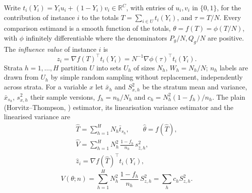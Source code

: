 Write $t_i(Y_i)=Y_iu_i+(1-Y_i)v_i\in\mathbb{R}^C$, with entries of $u_i,v_i$ in $\{0,1\}$, for the contribution of instance $i$
to the totals $T=\sum_{i\in U}t_i(Y_i)$, and $\tau=T/N$. Every comparison estimand is a smooth function of the totals,
$\theta=f(T)=\phi(T/N)$, with $\phi$ infinitely differentiable where the denominators $P_g/N,Q_g/N$ are positive. The
\emph{influence value} of instance $i$ is
\begin{equation}\label{eq:influence}
z_i=\nabla f(T)^{\top}t_i(Y_i)=N^{-1}\nabla\phi(\tau)^{\top}t_i(Y_i).
\end{equation}
Strata $h=1,\dots,H$ partition $U$ into sets $U_h$ of sizes $N_h$, $W_h=N_h/N$; $n_h$ labels
are drawn from $U_h$ by simple random sampling without replacement, independently across strata.
For a variable $x$ let $\bar x_h$ and $S^2_{x,h}$ be the stratum mean and variance, $\bar x_{s_h}$, $s^2_{x,h}$
their sample versions, $f_h=n_h/N_h$ and $c_h=N_h^2(1-f_h)/n_h$. The plain
(Horvitz--Thompson, \citealt{horvitz1952}) estimator, its linearisation variance estimator
\citep[Ch.~5]{sarndal1992} and the linearised variance are
\begin{equation}\label{eq:ht}
\begin{gathered}
\hat T=\sum_{h=1}^HN_h\bar t_{s_h},\qquad \hat\theta=f(\hat T),\\
\hat V=\sum_{h=1}^H N_h^2\,\frac{1-f_h}{n_h}\,s^2_{\hat z,h},\\
\hat z_i=\nabla f(\hat T)^{\top}t_i(Y_i),
\end{gathered}
\end{equation}
\begin{equation}\label{eq:linvar}
V(\theta;n)=\sum_{h=1}^HN_h^2\,\frac{1-f_h}{n_h}\,S^2_{z,h}=\sum_hc_hS^2_{z,h}.
\end{equation}

